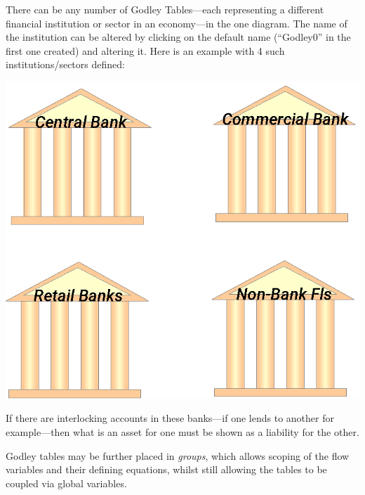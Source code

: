 There can be any number of Godley Tables---each representing a
different financial institution or sector in an economy---in the one
diagram. The name of the institution can be altered by clicking on the
default name (``Godley0'' in the first one created) and altering
it. Here is an example with 4 such institutions/sectors defined:


\begin{center}
\includegraphics{images/NewItem136.eps}
\end{center}

If there are interlocking accounts in these banks---if one lends to
another for example---then what is an asset for one must be shown as a
liability for the other. 

Godley tables may be further placed in {\em groups}, which allows
scoping of the flow variables and their defining equations, whilst
still allowing the tables to be coupled via global variables.
